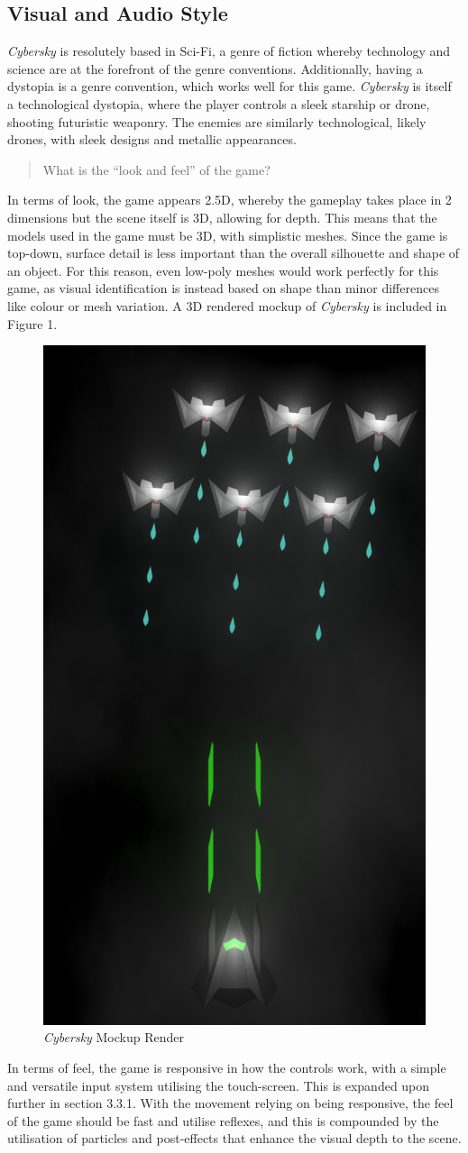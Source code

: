 \documentclass{scrartcl}
\begin{document}
\subsection{Visual and Audio Style}

\emph{Cybersky} is resolutely based in Sci-Fi, a genre of fiction whereby technology and science are at the forefront of the genre conventions. Additionally, having a dystopia is a genre convention, which works well for this game. \emph{Cybersky} is itself a technological dystopia, where the player controls a sleek starship or drone, shooting futuristic weaponry. The enemies are similarly technological, likely drones, with sleek designs and metallic appearances.

\begin{quote}
  What is the “look and feel” of the game?
\end{quote}

In terms of look, the game appears 2.5D, whereby the gameplay takes place in 2 dimensions but the scene itself is 3D, allowing for depth. This means that the models used in the game must be 3D, with simplistic meshes. Since the game is top-down, surface detail is less important than the overall silhouette and shape of an object. For this reason, even low-poly meshes would work perfectly for this game, as visual identification is instead based on shape than minor differences like colour or mesh variation. A 3D rendered mockup of \emph{Cybersky} is included in Figure 1.

\begin{figure}[!ht]
  \centering
  \includegraphics[width=.3\columnwidth]{mockup-01.png}
  \caption[\textit{Cybersky}]{\textit{Cybersky} Mockup Render}
\end{figure}

In terms of feel, the game is responsive in how the controls work, with a simple and versatile input system utilising the touch-screen. This is expanded upon further in section 3.3.1. With the movement relying on being responsive, the feel of the game should be fast and utilise reflexes, and this is compounded by the utilisation of particles and post-effects that enhance the visual depth to the scene.
\end{document}
